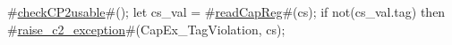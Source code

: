 #\hyperref[sailMIPSzcheckCP2usable]{checkCP2usable}#();
let cs_val = #\hyperref[sailMIPSzreadCapReg]{readCapReg}#(cs);
if not(cs_val.tag) then
  #\hyperref[sailMIPSzraisezyc2zyexception]{raise\_c2\_exception}#(CapEx_TagViolation, cs);
